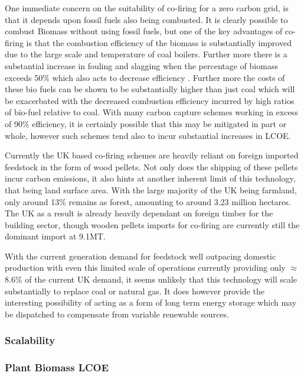 \documentclass[11pt]{article}
\numberwithin{equation}{section}
\begin{document}
One immediate concern on the suitability of co-firing for a zero carbon grid, is that it depends upon fossil fuels also being combusted. It is clearly possible to combust Biomass without using fossil fuels, but one of the key advantages of co-firing is that the combustion efficiency of the biomass is substantially improved due to the large scale and temperature of coal boilers. Further more there is a substantial increase in fouling and slagging when the percentage of biomass exceeds 50\% which also acts to decrease efficiency \cite{biomassNA}. Further more the costs of these bio fuels can be shown to be substantially higher than just coal which will be exacerbated with the decreased combustion efficiency incurred by high ratios of bio-fuel relative to coal. With many carbon capture schemes working in excess of 90\% efficiency, it is certainly possible that this may be mitigated in part or whole, however such schemes tend also to incur substantial increases in LCOE.

Currently the UK based co-firing schemes are heavily reliant on foreign imported feedstock in the form of wood pellets. Not only does the shipping of these pellets incur carbon emissions, it also hints at another inherent limit of this technology, that being land surface area. With the large majority of the UK being farmland, only around 13\% remains as forest, amounting to around 3.23 million hectares. The UK as a result is already heavily dependant on foreign timber for the building sector, though wooden pellets imports for co-firing are currently still the dominant import at 9.1MT.

With the current generation demand for feedstock well outpacing domestic production with even this limited scale of operations currently providing only \(\approx\)8.6\% of the current UK demand, it seems unlikely that this technology will scale substantially to replace coal or natural gas. It does however provide the interesting possibility of acting as a form of long term energy storage which may be dispatched to compensate from variable renewable sources.


\subsubsection{Scalability}
\label{sec:org51cf572}

\subsubsection{Plant Biomass LCOE}
\label{sec:orgb54dce0}
\end{document}
